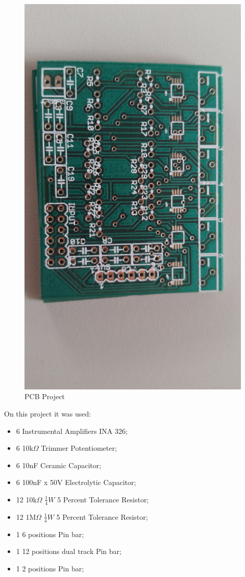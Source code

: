 \begin{figure}[!htpb]
\centering
\caption{PCB Project}
\label{PCB}
\includegraphics[scale=0.08]{images/INA_board}
\end{figure}

On this project it was used:

\begin{itemize}
\item 6 Instrumental Amplifiers INA 326;
\item 6 10k$\Omega$ Trimmer Potentiometer;
\item 6 10nF Ceramic Capacitor;
\item 6 100nF x 50V Electrolytic Capacitor;
\item 12 10k$\Omega$ $\frac{1}{4}W$ 5 Percent Tolerance Resistor;
\item 12 1M$\Omega$ $\frac{1}{4}W$ 5 Percent Tolerance Resistor;
\item 1 6 positions Pin bar;
\item 1 12 positions dual track Pin bar;
\item 1 2 positions Pin bar;
\end{itemize}

